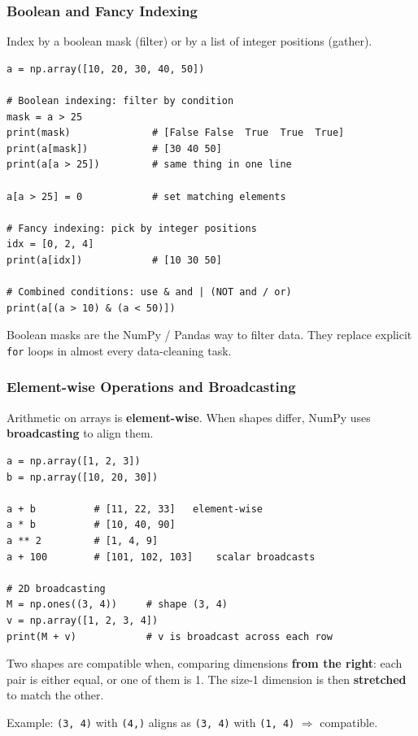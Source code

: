 \documentclass[aspectratio=169,10pt]{beamer}
\newcommand{\keyword}[1]{\textcolor{PrimaryBlue}{\textbf{#1}}}
\newcommand{\codeword}[1]{\texttt{#1}}
\begin{document}
\begin{frame}[fragile]
\frametitle{Boolean and Fancy Indexing}
\small
Index by a boolean mask (filter) or by a list of integer positions (gather).

\vspace{0.12cm}
\begin{lstlisting}[style=pycode]
a = np.array([10, 20, 30, 40, 50])

# Boolean indexing: filter by condition
mask = a > 25
print(mask)              # [False False  True  True  True]
print(a[mask])           # [30 40 50]
print(a[a > 25])         # same thing in one line

a[a > 25] = 0            # set matching elements

# Fancy indexing: pick by integer positions
idx = [0, 2, 4]
print(a[idx])            # [10 30 50]

# Combined conditions: use & and | (NOT and / or)
print(a[(a > 10) & (a < 50)])
\end{lstlisting}

\begin{tcolorbox}[lecturebox,title=Why this matters]
Boolean masks are the NumPy / Pandas way to filter data. They replace explicit \codeword{for} loops in almost every data-cleaning task.
\end{tcolorbox}
\end{frame}


\begin{frame}[fragile]
\frametitle{Element-wise Operations and Broadcasting}
\small
Arithmetic on arrays is \keyword{element-wise}. When shapes differ, NumPy uses \keyword{broadcasting} to align them.

\vspace{0.12cm}
\begin{lstlisting}[style=pycode]
a = np.array([1, 2, 3])
b = np.array([10, 20, 30])

a + b          # [11, 22, 33]   element-wise
a * b          # [10, 40, 90]
a ** 2         # [1, 4, 9]
a + 100        # [101, 102, 103]    scalar broadcasts

# 2D broadcasting
M = np.ones((3, 4))     # shape (3, 4)
v = np.array([1, 2, 3, 4])
print(M + v)            # v is broadcast across each row
\end{lstlisting}

\begin{tcolorbox}[lecturebox,title=Broadcasting rules]
Two shapes are compatible when, comparing dimensions \keyword{from the right}: each pair is either equal, or one of them is 1. The size-1 dimension is then \keyword{stretched} to match the other.

\vspace{0.06cm}
Example: \codeword{(3, 4)} with \codeword{(4,)} aligns as \codeword{(3, 4)} with \codeword{(1, 4)} \(\Rightarrow\) compatible.
\end{tcolorbox}
\end{frame}
\end{document}
